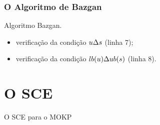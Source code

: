 \documentclass[10pt,xcolor=table,fleqn]{beamer}
\newcommand{\mytitle}[1]{
  \begin{center}
    \color{defblue}
    { \LARGE #1 }
  \end{center}
}
\begin{document}
\begin{frame}
	\frametitle{O Algoritmo de Bazgan}
  \begin{algorithm}[H]
    \footnotesize
    
    \caption{Algoritmo Bazgan.}
  \end{algorithm}
  \pause
  \begin{itemize}
    \item{ verificação da condição $u \Delta s$ (linha 7);} \pause
    \item{ verificação da condição $lb(u) \Delta ub(s)$ (linha 8).}
  \end{itemize}
\end{frame}

\section{O SCE}

\begin{frame}
	\mytitle{O SCE para o MOKP}
\end{frame}
\end{document}
